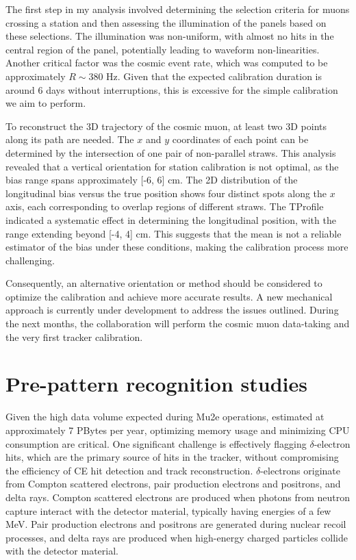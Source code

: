The first step in my analysis involved determining the selection criteria for 
muons crossing a station and then assessing the illumination of the panels based 
on these selections. The illumination was non-uniform, with almost no hits 
in the central region of the panel, potentially leading to waveform non-linearities. 
Another critical factor was the cosmic event rate, which was computed to be approximately 
$R \sim 380$ Hz. Given that the expected calibration duration is around 6 days 
without interruptions, this is excessive for the simple calibration we aim to perform.

To reconstruct the 3D trajectory of the cosmic muon, at least 
two 3D points along its path are needed. The $x$ and $y$ coordinates 
of each point can be determined by the intersection of one pair of 
non-parallel straws. This analysis revealed that a vertical orientation 
for station calibration is not optimal, as the bias range spans approximately [-6, 6] cm. 
The 2D distribution of the longitudinal bias versus the true position shows four 
distinct spots along the $x$ axis, each corresponding to overlap regions of 
different straws. The TProfile indicated a systematic effect in determining 
the longitudinal position, with the range extending beyond [-4, 4] cm. 
This suggests that the mean is not a reliable estimator of the bias under 
these conditions, making the calibration process more challenging.

Consequently, an alternative orientation or method should be considered to 
optimize the calibration and achieve more accurate results. A new 
mechanical approach is currently under development to address the issues outlined. 
During the next months, the collaboration will perform the cosmic muon data-taking and 
the very first tracker calibration.
\section{Pre-pattern recognition studies}

Given the high data volume expected during Mu2e operations, 
estimated at approximately 7 PBytes per year, optimizing memory usage 
and minimizing CPU consumption are critical. One significant challenge 
is effectively flagging $\delta$-electron hits, which are the primary source 
of hits in the tracker, without compromising the efficiency of CE hit detection and 
track reconstruction. $\delta$-electrons originate from Compton scattered electrons, 
pair production electrons and positrons, and delta rays. Compton scattered electrons 
are produced when photons from neutron capture interact with the detector material, 
typically having energies of a few MeV. Pair production electrons and positrons 
are generated during nuclear recoil processes, and delta rays are produced 
when high-energy charged particles collide with the detector material.

